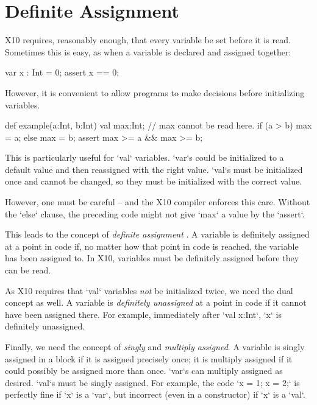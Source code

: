 \chapter{Definite Assignment}
\label{sect:DefiniteAssignment}

X10 requires, reasonably enough, that every variable be set before it is read.
Sometimes this is easy, as when a variable is declared and assigned together: 
\begin{xten}
  var x : Int = 0;
  assert x == 0;
\end{xten}
However, it is convenient to allow programs to make decisions before
initializing variables.
\begin{xten}
def example(a:Int, b:Int) {
  val max:Int;
  // max cannot be read here.
  if (a > b) max = a;
  else max = b;
  assert max >= a && max >= b;
}
\end{xten}
This is particularly useful for \xcd`val` variables.  \xcd`var`s could be
initialized to a default value and then reassigned with the right value.
\xcd`val`s must be initialized once and cannot be changed, so they must be
initialized with the correct value. 

However, one must be careful -- and the X10 compiler enforces this care.
Without the \xcd`else` clause, the preceding code might not give \xcd`max` a
value by the \xcd`assert`.  

This leads to the concept of {\em definite assignment} \cite{Javasomething}.
A variable is definitely assigned at a point in code if, no matter how that
point in code is reached, the variable has been assigned to.  In X10,
variables must be definitely assigned before they can be read.


As X10 requires that \xcd`val` variables {\em not} be initialized
twice,  we need the dual concept as well.  A variable is {\em definitely
unassigned} at a point in code if it cannot have been assigned there.  For
example, immediately after \xcd`val x:Int`, \xcd`x` is definitely unassigned. 

Finally, we need the concept of {\em singly} and {\em multiply assigned}.
A variable is singly assigned in a block if it is assigned precisely
once; it is multiply assigned if it could possibly be assigned more than once.  
\xcd`var`s can  multiply assigned as desired. \xcd`val`s must be singly
assigned.  For example, the code \xcd`x = 1; x = 2;` is perfectly fine if
\xcd`x` is a \xcd`var`, but incorrect (even in a constructor) if \xcd`x` is a
\xcd`val`.  

